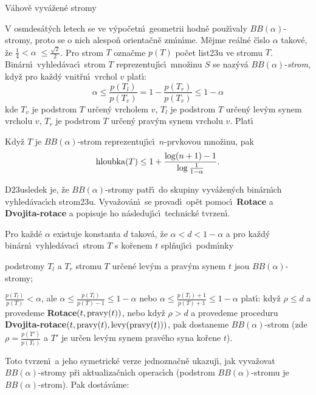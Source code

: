 \heading
V\'ahov\v e vyv\'a\v zen\'e stromy
\endheading

\flushpar V osmdes\'at\'ych letech se ve v\'ypo\v cetn\'\i\ geometrii 
hodn\v e pou\v z\'\i\-va\-ly $BB(\alpha )$-stromy, proto se o nich alespo\v n 
orienta\v cn\v e zm\'\i n\'\i me. M\v ejme re\'aln\'e \v c\'\i slo $
\alpha$ takov\'e, \v ze 
$\frac 14<\alpha\;\le\frac {\sqrt 2}2$. Pro strom $T$ ozna\v cme $
p(T)$ po\v cet 
list\accent23u ve stromu $T$. Bin\'arn\'\i\ vyhled\'avac\'\i\ strom $T$ 
reprezentuj\'\i c\'\i\ mno\v zinu $S$ se naz\'yv\'a $BB(\alpha )$-\emph{strom}, 
kdy\v z pro ka\v zd\'y vnit\v rn\'\i\ vrchol $v$ plat\'\i :
$$\alpha\le\frac {p(T_l)}{p (T_v)}=1-\frac {p(T_r)}{p(T_v)}\le 1-\alpha$$
kde $T_v$ je podstrom $T$ ur\v cen\'y vrcholem $v$, $T_l$ je podstrom 
$T$ ur\v cen\'y lev\'ym synem vrcholu $v$, $T_r$ je podstrom $T$ 
ur\v cen\'y prav\'ym synem vrcholu $v$. Plat\'\i


Kdy\v z $T$ je $BB(\alpha )$-strom reprezentuj\'\i c\'\i\ 
$n$-prvkovou mno\v zinu, pak 
$$\operatorname{hloubka}(T)\le 1+\frac {\log(n+1)-1}{\log\frac 1{1-\alpha}}.$$
\endproclaim

\flushpar D\accent23usledek je, \v ze $BB(\alpha )$-stromy pat\v r\'\i\ do 
skupiny vyv\'a\v zen\'ych bin\'arn\'\i ch vyhled\'avac\'\i ch 
stro\-m\accent23u.  Vyva\v zov\'an\'\i\ se provad\'\i\ op\v et pomoc\'\i\ 
{\bf Rotace} a {\bf Dvojita-rotace} a popisuje ho n\'asledu\-j\'\i\-c\'\i\ 
technick\'e tvrzen\'\i. 

\proclaim{Tvrzen\'\i}Pro ka\v zd\'e $\alpha$ existuje konstanta $
d$ 
takov\'a, \v ze $\alpha <d<1-\alpha$ a pro ka\v zd\'y bin\'arn\'\i\ vyhled\'avac\'\i\ 
strom $T$ s ko\v renem $t$ spl\v nuj\'\i c\'\i\ podm\'\i nky
\roster
\item
podstromy $T_l$ a $T_r$ stromu $T$ ur\v cen\'e lev\'ym a prav\'ym 
synem $t$ jsou $BB(\alpha )$-stromy;
\item
$\frac {p(T_l)}{p(T)}<\alpha$, ale $\alpha\le\frac {
p(T_l)}{p(T)-1}\le 1-\alpha$ nebo $\alpha\le\frac {
p(T_l)+1}{p(T)+1}\le 1-\alpha$
\endroster
plat\'\i :\newline 
kdy\v z $\rho\le d$ a provedeme {\bf Rotace$(t,\operatorname{pravy}(t))$}, nebo kdy\v z 
$\rho >d$ a provedeme proceduru {\bf Dvojita-rotace$(t,\operatorname{pravy}(t),\operatorname{levy}(\operatorname{pravy}(t)))$}, pak dostaneme 
$BB(\alpha )$-strom (zde $\rho =\frac {p(T')}{p(T_r
)}$ a $T'$ je ur\v cen lev\'ym synem 
prav\'e\-ho syna ko\v rene $t$).  
\endproclaim

\flushpar Toto tvrzen\'\i\ a jeho symetrick\'e verze jednozna\v cn\v e ukazuj\'\i , 
jak vyva\v zovat $BB(\alpha )$-stromy p\v ri aktualiza\v cn\'\i ch 
operac\'\i ch (podstrom $BB(\alpha )$-stromu je $BB(\alpha )$-strom). Pak dost\'av\'ame:

